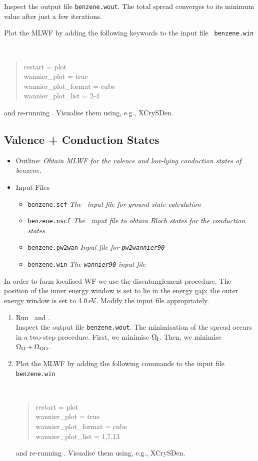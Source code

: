 \documentclass[a4paper,11pt,twoside]{article}
\begin{document}
Inspect the output file {\tt benzene.wout}. The total spread converges
to its minimum value after just a few iterations. 

Plot the MLWF by adding the following keywords to the input file {\tt
  benzene.win} 
{\tt
\begin{quote}
restart               = plot\\
wannier\_plot         = true\\
wannier\_plot\_format = cube\\
wannier\_plot\_list   = 2-4
\end{quote} }
and re-running \wannier. Visualise them using, e.g., XCrySDen. 

\subsection*{Valence + Conduction States}

\begin{itemize}
\item{Outline: \it{Obtain MLWF for the valence and low-lying
    conduction states of benzene.}} 
\item{Input Files}
\begin{itemize}
\item{ {\tt benzene.scf}  {\it The \pwscf\ input file for ground state
    calculation}} 
\item{ {\tt benzene.nscf}  {\it The \pwscf\ input file to obtain Bloch
    states for the conduction states}} 
\item{ {\tt benzene.pw2wan}  {\it Input file for {\tt pw2wannier90}}}
\item{ {\tt benzene.win}  {\it The {\tt wannier90} input file}}
\end{itemize}
\end{itemize}
In order to form localised WF we use the disentanglement
procedure. The position of the inner energy window is set to lie in
the energy gap; the outer energy window is set to 4.0\,eV. Modify the
input file appropriately. 
\begin{enumerate}
\item Run \pwscf\ and \wannier.\\
Inspect the output file {\tt benzene.wout}. The minimisation of the
spread occurs in a two-step procedure. First, we minimise $\Omega_{\rm
  I}$. Then, we minimise $\Omega_{\rm O}+\Omega_{{\rm OD}}$.

\item Plot the MLWF by adding the following commands to the
 input file {\tt benzene.win}
{\tt
\begin{quote}
restart               = plot\\
wannier\_plot         = true\\
wannier\_plot\_format = cube\\
wannier\_plot\_list   = 1,7,13
\end{quote} }
and re-running \wannier. Visualise them using, e.g., XCrySDen. 
\end{enumerate}
\end{document}
